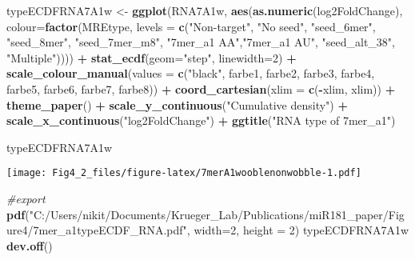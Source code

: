 \documentclass[
]{article}
\newenvironment{Shaded}{\begin{snugshade}}{\end{snugshade}}
\newcommand{\AttributeTok}[1]{\textcolor[rgb]{0.13,0.29,0.53}{#1}}
\newcommand{\CommentTok}[1]{\textcolor[rgb]{0.56,0.35,0.01}{\textit{#1}}}
\newcommand{\DecValTok}[1]{\textcolor[rgb]{0.00,0.00,0.81}{#1}}
\newcommand{\FunctionTok}[1]{\textcolor[rgb]{0.13,0.29,0.53}{\textbf{#1}}}
\newcommand{\NormalTok}[1]{#1}
\newcommand{\OtherTok}[1]{\textcolor[rgb]{0.56,0.35,0.01}{#1}}
\newcommand{\SpecialCharTok}[1]{\textcolor[rgb]{0.81,0.36,0.00}{\textbf{#1}}}
\newcommand{\StringTok}[1]{\textcolor[rgb]{0.31,0.60,0.02}{#1}}
\begin{document}
\begin{Shaded}
\begin{Highlighting}[]
\NormalTok{typeECDFRNA7A1w }\OtherTok{\textless{}{-}} \FunctionTok{ggplot}\NormalTok{(RNA7A1w, }\FunctionTok{aes}\NormalTok{(}\FunctionTok{as.numeric}\NormalTok{(log2FoldChange), }
                              \AttributeTok{colour=}\FunctionTok{factor}\NormalTok{(MREtype, }\AttributeTok{levels =} \FunctionTok{c}\NormalTok{(}\StringTok{"Non{-}target"}\NormalTok{, }\StringTok{"No seed"}\NormalTok{, }\StringTok{"seed\_6mer"}\NormalTok{, }\StringTok{"seed\_8mer"}\NormalTok{, }\StringTok{"seed\_7mer\_m8"}\NormalTok{, }\StringTok{"7mer\_a1 AA"}\NormalTok{,}\StringTok{"7mer\_a1 AU"}\NormalTok{, }\StringTok{"seed\_alt\_38"}\NormalTok{, }\StringTok{"Multiple"}\NormalTok{)))) }\SpecialCharTok{+} 
  \FunctionTok{stat\_ecdf}\NormalTok{(}\AttributeTok{geom=}\StringTok{"step"}\NormalTok{, }\AttributeTok{linewidth=}\DecValTok{2}\NormalTok{) }\SpecialCharTok{+}
  \FunctionTok{scale\_colour\_manual}\NormalTok{(}\AttributeTok{values =} \FunctionTok{c}\NormalTok{(}\StringTok{"black"}\NormalTok{, farbe1, farbe2, farbe3, farbe4, farbe5, farbe6, farbe7, farbe8)) }\SpecialCharTok{+}
  \FunctionTok{coord\_cartesian}\NormalTok{(}\AttributeTok{xlim =} \FunctionTok{c}\NormalTok{(}\SpecialCharTok{{-}}\NormalTok{xlim, xlim)) }\SpecialCharTok{+} 
  \FunctionTok{theme\_paper}\NormalTok{() }\SpecialCharTok{+}
  \FunctionTok{scale\_y\_continuous}\NormalTok{(}\StringTok{"Cumulative density"}\NormalTok{) }\SpecialCharTok{+} \FunctionTok{scale\_x\_continuous}\NormalTok{(}\StringTok{"log2FoldChange"}\NormalTok{) }\SpecialCharTok{+}
  \FunctionTok{ggtitle}\NormalTok{(}\StringTok{"RNA type of 7mer\_a1"}\NormalTok{)}

\NormalTok{typeECDFRNA7A1w}
\end{Highlighting}
\end{Shaded}

\texttt{[image: Fig4\_2\_files/figure-latex/7merA1wooblenonwobble-1.pdf]}

\begin{Shaded}
\begin{Highlighting}[]
\CommentTok{\#export}
\FunctionTok{pdf}\NormalTok{(}\StringTok{"C:/Users/nikit/Documents/Krueger\_Lab/Publications/miR181\_paper/Figure4/7mer\_a1typeECDF\_RNA.pdf"}\NormalTok{, }\AttributeTok{width=}\DecValTok{2}\NormalTok{, }\AttributeTok{height =} \DecValTok{2}\NormalTok{)}
\NormalTok{typeECDFRNA7A1w}
\FunctionTok{dev.off}\NormalTok{()}
\end{Highlighting}
\end{Shaded}
\end{document}
